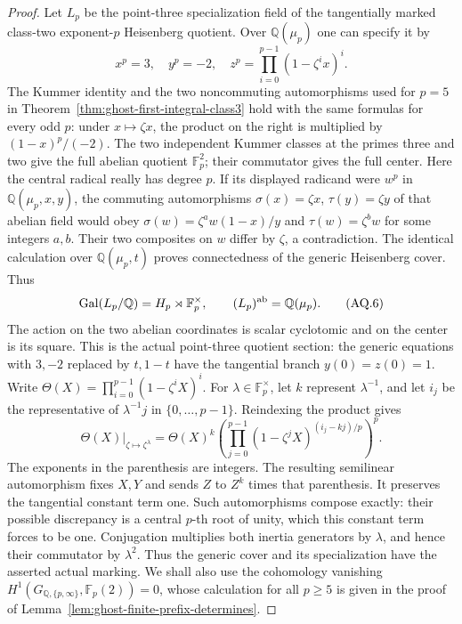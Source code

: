 \begin{proof}
Let \(L_p\) be the point-three specialization field
of the tangentially marked class-two exponent-\(p\)
Heisenberg quotient. Over \(\mathbb Q(\mu_p)\)
one can specify it by
\[
 x^p=3,\quad y^p=-2,\quad
 z^p=\prod_{i=0}^{p-1}(1-\zeta^i x)^i.
 \tag{AQ.5}
\]
The Kummer identity and the two noncommuting
automorphisms used for \(p=5\) in
Theorem~\ref{thm:ghost-first-integral-class3}
hold with the same formulas for every odd \(p\):
under \(x\mapsto\zeta x\), the product on the
right is multiplied by \((1-x)^p/(-2)\).
The two independent Kummer classes at the primes
three and two give the full abelian quotient
\(\mathbb F_p^2\); their commutator gives the
full center. Here the central radical really has
degree \(p\). If its displayed radicand were
\(w^p\) in \(\mathbb Q(\mu_p,x,y)\), the commuting
automorphisms \(\sigma(x)=\zeta x\),
\(\tau(y)=\zeta y\) of that abelian field would obey
\(\sigma(w)=\zeta^a w(1-x)/y\) and
\(\tau(w)=\zeta^b w\) for some integers \(a,b\).
Their two composites on \(w\) differ by \(\zeta\),
a contradiction. The identical calculation over
\(\mathbb Q(\mu_p,t)\) proves connectedness of the
generic Heisenberg cover. Thus
\[
 \operatorname{Gal}(L_p/\mathbb Q)
       =H_p\rtimes\mathbb F_p^\times,\qquad
 (L_p)^{\rm ab}=\mathbb Q(\mu_p).
 \tag{AQ.6}
\]
The action on the two abelian coordinates is scalar
cyclotomic and on the center is its square.
This is the actual point-three quotient section:
the generic equations with \(3,-2\) replaced by
\(t,1-t\) have the tangential branch \(y(0)=z(0)=1\).
Write \(\Theta(X)=\prod_{i=0}^{p-1}(1-\zeta^iX)^i\).
For \(\lambda\in\mathbb F_p^\times\), let \(k\)
represent \(\lambda^{-1}\), and let \(i_j\) be the
representative of \(\lambda^{-1}j\) in
\(\{0,\ldots,p-1\}\). Reindexing the product gives
\[
 \Theta(X)\big|_{\zeta\mapsto\zeta^\lambda}
   =\Theta(X)^k
       \left(\prod_{j=0}^{p-1}
          (1-\zeta^jX)^{(i_j-kj)/p}\right)^p.
 \tag{AQ.6a}
\]
The exponents in the parenthesis are integers.
The resulting semilinear automorphism fixes \(X,Y\)
and sends \(Z\) to \(Z^k\) times that parenthesis.
It preserves the tangential constant term one.
Such automorphisms compose exactly: their possible
discrepancy is a central \(p\)-th root of unity,
which this constant term forces to be one.
Conjugation multiplies both inertia generators
by \(\lambda\), and hence their commutator by
\(\lambda^2\). Thus the generic cover and its
specialization have the asserted actual marking.
We shall also use the cohomology vanishing
\(H^1(G_{\mathbb Q,\{p,\infty\}},\mathbb F_p(2))=0\),
whose calculation for all \(p\ge5\) is given in
the proof of Lemma~\ref{lem:ghost-finite-prefix-determines}.


\end{proof}

